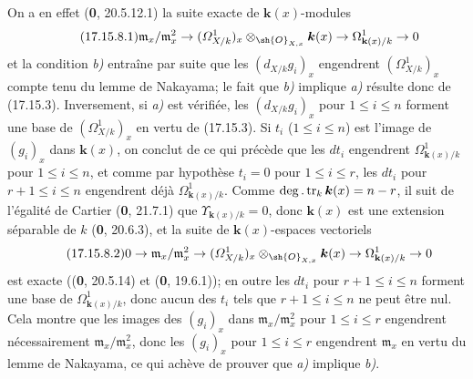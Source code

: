 On a en effet (\textbf{0}, 20.5.12.1) la suite exacte de $\boldsymbol{k}(x)$-modules
\[
\label{IV.17.15.8.1}
\tag{17.15.8.1}
\mathfrak m_x/\mathfrak m_x^2\to(\varOmega^1_{X/k})_x\otimes_{\sh{O}_{X,x}}\boldsymbol{k}(x)\to\Omega^1_{\mathbf{k}(x)/k}\to0
\]
et la condition \emph{b)} entraîne par suite que les $(d_{X/k}g_i)_x$ engendrent $(\varOmega^1_{X/k})_x$ compte tenu du lemme de Nakayama; le fait que \emph{b)} implique \emph{a)} résulte donc de (17.15.3). Inversement, si \emph{a)} est vérifiée, les $(d_{X/k}g_i)_x$ pour $1\leq i\leq n$ forment une base de $(\varOmega^1_{X/k})_x$ en vertu de (17.15.3). Si $t_i$ ($1\leq i\leq n$) est l'image de $(g_i)_x$ dans $\boldsymbol{k}(x)$, on conclut de ce qui précède que les $dt_i$ engendrent $\Omega^1_{\mathbf{k}(x)/k}$ pour $1\leq i\leq n$, et comme par hypothèse $t_i=0$ pour $1\leq i\leq r$, les $dt_i$ pour $r+1\leq i\leq n$ engendrent déjà $\Omega^1_{\mathbf{k}(x)/k}$. Comme $\deg.\operatorname{tr}_k \boldsymbol{k}(x)=n- r$, il suit de l'égalité de Cartier (\textbf{0}, 21.7.1) que $\Upsilon_{\mathbf{k}(x)/k}=0$, donc $\boldsymbol{k}(x)$ est une extension séparable de $k$ (\textbf{0}, 20.6.3), et la suite de $\boldsymbol{k}(x)$-espaces vectoriels
\[
\label{IV.17.15.8.2}
\tag{17.15.8.2}
0\to\mathfrak m_x/\mathfrak m_x^2\to(\varOmega^1_{X/k})_x\otimes_{\sh{O}_{X,x}}\boldsymbol{k}(x)\to\Omega^1_{\mathbf{k}(x)/k}\to0
\]
est exacte ((\textbf{0}, 20.5.14) et (\textbf{0}, 19.6.1)); en outre les $dt_i$ pour $r+1\leq i\leq n$ forment une base de $\Omega^1_{\mathbf{k}(x)/k}$, donc aucun des $t_i$ tels que $r+1\leq i\leq n$ ne peut être nul. Cela montre que les images des $(g_i)_x$ dans $\mathfrak m_x/\mathfrak m_x^2$ pour $1\leq i\leq r$ engendrent nécessairement $\mathfrak m_x/\mathfrak m_x^2$, donc les $(g_i)_x$ pour $1\leq i\leq r$ engendrent $\mathfrak m_x$ en vertu du lemme de Nakayama, ce qui achève de prouver que \emph{a)} implique \emph{b)}.


